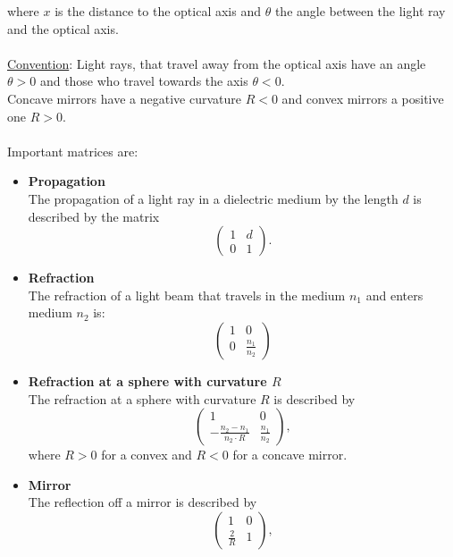 \documentclass{article}
\begin{document}
where $x$ is the distance to the optical axis and $\theta$ the angle between the light ray and the optical axis.\\
\\
\underline{Convention}: Light rays, that travel away from the optical axis have an angle $\theta > 0$ and those who travel towards the axis $\theta < 0$.\\
Concave mirrors have a negative curvature $R<0$ and convex mirrors a positive one $R>0$.\\
\\
Important matrices are:
	\begin{itemize}
		\item \textbf{Propagation}\\
		The propagation of a light ray in a dielectric medium by the length $d$ is described by the matrix
			\begin{equation}
				\begin{pmatrix}
					1 & d \\
					0 & 1
				\end{pmatrix}.
			\end{equation}


		\item \textbf{Refraction}\\
		The refraction of a light beam that travels in the medium $n_1$ and enters medium $n_2$ is:
			\begin{equation}
				\begin{pmatrix}
					1 & 0 \\
					0 & \frac{n_1}{n_2}
				\end{pmatrix}
			\end{equation}


		\item \textbf{Refraction at a sphere with curvature $R$}	\\
		The refraction at a sphere with curvature $R$ is described by
			\begin{equation}
				\begin{pmatrix}
					1 & 0 \\
					-\frac{n_2 - n_1}{n_2 \cdot R} & \frac{n_1}{n_2}
				\end{pmatrix},
			\end{equation}
		where $R>0$ for a convex and $R<0$ for a concave mirror.


		\item \textbf{Mirror}\\
		The reflection off a mirror is described by
			\begin{equation}
				\begin{pmatrix}
					1 & 0 \\
					\frac{2}{R} & 1
				\end{pmatrix},
			\end{equation}
		

\end{itemize}
\end{document}
